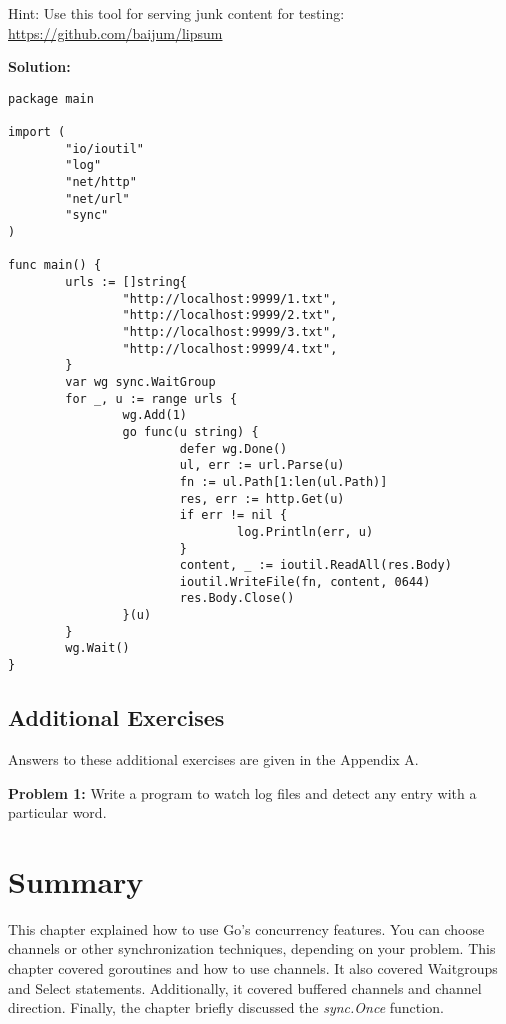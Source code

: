 \noindent
Hint: Use this tool for serving junk content for testing:
\url{https://github.com/baijum/lipsum}

\textbf{Solution:}

\begin{lstlisting}[numbers=none]
package main

import (
        "io/ioutil"
        "log"
        "net/http"
        "net/url"
        "sync"
)

func main() {
        urls := []string{
                "http://localhost:9999/1.txt",
                "http://localhost:9999/2.txt",
                "http://localhost:9999/3.txt",
                "http://localhost:9999/4.txt",
        }
        var wg sync.WaitGroup
        for _, u := range urls {
                wg.Add(1)
                go func(u string) {
                        defer wg.Done()
                        ul, err := url.Parse(u)
                        fn := ul.Path[1:len(ul.Path)]
                        res, err := http.Get(u)
                        if err != nil {
                                log.Println(err, u)
                        }
                        content, _ := ioutil.ReadAll(res.Body)
                        ioutil.WriteFile(fn, content, 0644)
                        res.Body.Close()
                }(u)
        }
        wg.Wait()
}
\end{lstlisting}


\subsection{Additional Exercises}

Answers to these additional exercises are given in the Appendix A.

\textbf{Problem 1:} Write a program to watch log files and detect any entry with a particular word.

\section*{Summary}

This chapter explained how to use Go's concurrency features. You can choose
channels or other synchronization techniques, depending on your problem. This
chapter covered goroutines and how to use channels. It also covered Waitgroups
and Select statements. Additionally, it covered buffered channels and channel
direction. Finally, the chapter briefly discussed the \textit{sync.Once}
function.
